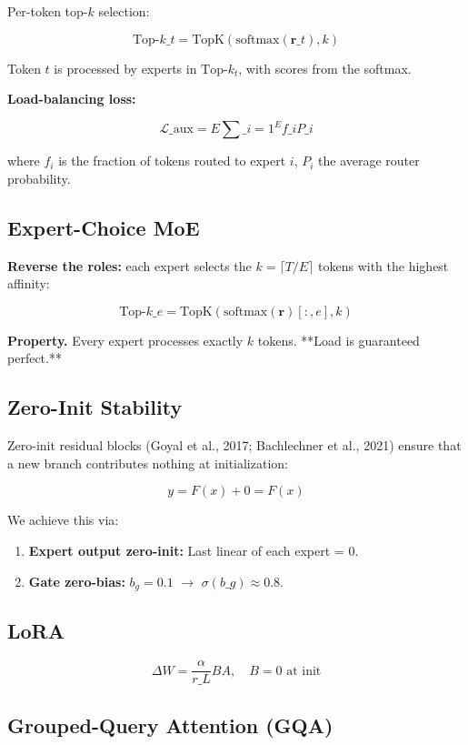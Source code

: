 Per-token top-$k$ selection:

\[
\text{Top-}k\_t = \text{TopK}(\text{softmax}(\mathbf{r}\_t), k)
\tag{3.5}
\]

Token $t$ is processed by experts in $\text{Top-}k_t$, with scores from the 
softmax.

\textbf{Load-balancing loss:}

\[
\mathcal{L}\_\text{aux} = E \sum\_{i=1}^{E} f\_i P\_i
\tag{3.6}
\]

where $f_i$ is the fraction of tokens routed to expert $i$, $P_i$ the 
average router probability.

\subsection{Expert-Choice MoE}

\textbf{Reverse the roles:} each expert selects the $k = \lceil T / E \rceil$ 
tokens with the highest affinity:

\[
\text{Top-}k\_e = \text{TopK}\!\left(\text{softmax}(\mathbf{r})[:, e], k\right)
\tag{3.7}
\]

\textbf{Property.} Every expert processes exactly $k$ tokens. **Load is 
guaranteed perfect.**

\subsection{Zero-Init Stability}

Zero-init residual blocks (Goyal et al., 2017; Bachlechner et al., 2021) 
ensure that a new branch contributes nothing at initialization:

\[
y = F(x) + 0 = F(x)
\tag{3.8}
\]

We achieve this via:

\begin{enumerate}
\item \textbf{Expert output zero-init:} Last linear of each expert = 0.
\item \textbf{Gate zero-bias:} $b_g = 0.1$ $\to$ $\sigma(b\_g) \approx
  0.8$.

\end{enumerate}
\subsection{LoRA}

\[
\Delta W = \frac{\alpha}{r\_L} B A, \quad B = 0 \text{ at init}
\tag{3.9}
\]

\subsection{Grouped-Query Attention (GQA)}

